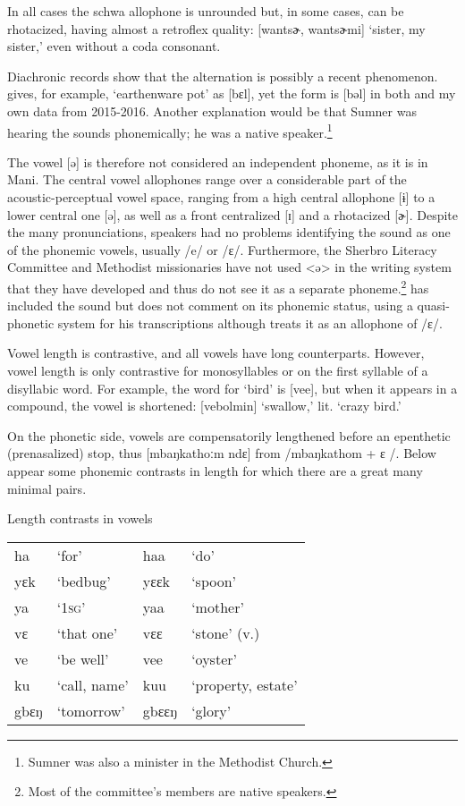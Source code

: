 In all cases the schwa allophone is unrounded but, in some cases, can be rhotacized, having almost a retroflex quality: [wantsɚ, wantsɚmi] ‘sister, my sister,' even without a coda consonant.

Diachronic records show that the alternation is possibly a recent phenomenon. \citet{Sumner1921}  gives, for example, ‘earthenware pot' as [bɛl], yet the form is [bəl] in both \citet{Pichl1967} and my own data from 2015-2016. Another explanation would be that Sumner was hearing the sounds phonemically; he was a native speaker.\footnote{Sumner was also a minister in the Methodist Church.}

The vowel [ə] is therefore not considered an independent phoneme, as it is in Mani. The central vowel allophones range over a considerable part of the acoustic-perceptual vowel space, ranging from a high central allophone [ɨ] to a lower central one [ə], as well as a front centralized [ɪ] and a rhotacized [ɚ]. Despite the many pronunciations, speakers had no problems identifying the sound as one of the phonemic vowels, usually /e/ or /ɛ/. Furthermore, the Sherbro Literacy Committee and Methodist missionaries have not used <ə> in the writing system that they have developed and thus do not see it as a separate phoneme.\footnote{Most of the committee's members are native speakers.} \citet{Sumner1921} has included the sound but does not comment on its phonemic status, using a quasi-phonetic system for his transcriptions although \citet{Pichl1967} treats it as an allophone of /ɛ/.

Vowel length is contrastive, and all vowels have long counterparts. However, vowel length is only contrastive for monosyllables or on the first syllable of a disyllabic word. For example, the word for ‘bird' is [vee], but when it appears in a compound, the vowel is shortened: [vebolmin] ‘swallow,' lit. ‘crazy bird.'

On the phonetic side, vowels are compensatorily lengthened before an epenthetic (prenasalized) stop, thus [mbaŋkathoːm ndɛ] from /mbaŋkathom + ɛ /. Below appear some phonemic contrasts in length for which there are a great many minimal pairs.

\ea %
\label{ex:16} Length contrasts in vowels\\
\vspace{6pt}
\begin{tabular}[t]{llll}
ha & ‘for' & haa & ‘do' \\
yɛk & ‘bedbug'  & yɛɛk & ‘spoon' \\
ya & ‘\textsc{1sg}'  & yaa & ‘mother'\\
vɛ & ‘that one' & vɛɛ & ‘stone' (v.)\\
ve & ‘be well'   & vee & ‘oyster'\\
ku & ‘call, name'   & kuu & ‘property, estate'\\
gbɛŋ & ‘tomorrow' & gbɛɛŋ & ‘glory'\\
\end{tabular}
\z

